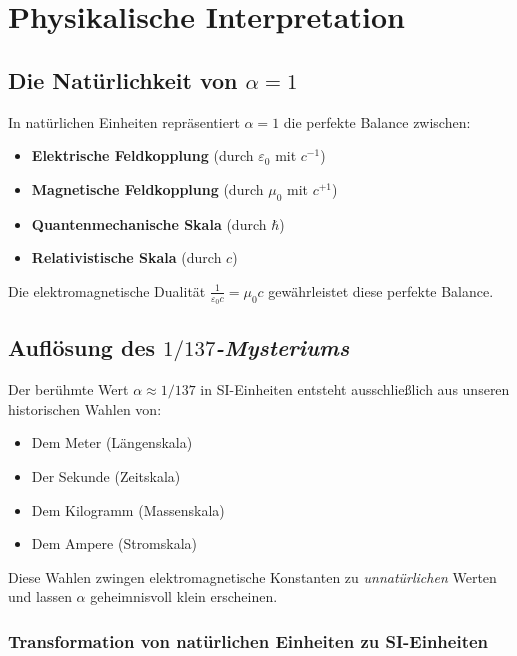 \documentclass[12pt,a4paper]{article}
\begin{document}
	\section{Physikalische Interpretation}
	
	\subsection{Die Natürlichkeit von $\alpha = 1$}
	
	\begin{tcolorbox}[colback=green!5!white,colframe=green!75!black,title=Wichtige physikalische Erkenntnis]
		In natürlichen Einheiten repräsentiert $\alpha = 1$ die perfekte Balance zwischen:
		\begin{itemize}
			\item \textbf{Elektrische Feldkopplung} (durch $\varepsilon_0$ mit $c^{-1}$)
			\item \textbf{Magnetische Feldkopplung} (durch $\mu_0$ mit $c^{+1}$)
			\item \textbf{Quantenmechanische Skala} (durch $\hbar$)
			\item \textbf{Relativistische Skala} (durch $c$)
		\end{itemize}
		
		Die elektromagnetische Dualität $\frac{1}{\varepsilon_0 c} = \mu_0 c$ gewährleistet diese perfekte Balance.
	\end{tcolorbox}
	
	\subsection{Auflösung des \textit{$1/137$-Mysteriums}}
	
	Der berühmte Wert $\alpha \approx 1/137$ in SI-Einheiten entsteht ausschließlich aus unseren historischen Wahlen von:
	\begin{itemize}
		\item Dem Meter (Längenskala)
		\item Der Sekunde (Zeitskala)  
		\item Dem Kilogramm (Massenskala)
		\item Dem Ampere (Stromskala)
	\end{itemize}
	
	Diese Wahlen zwingen elektromagnetische Konstanten zu \textit{unnatürlichen} Werten und lassen $\alpha$ geheimnisvoll klein erscheinen.
	
	\subsubsection{Transformation von natürlichen Einheiten zu SI-Einheiten}
	
\end{document}
